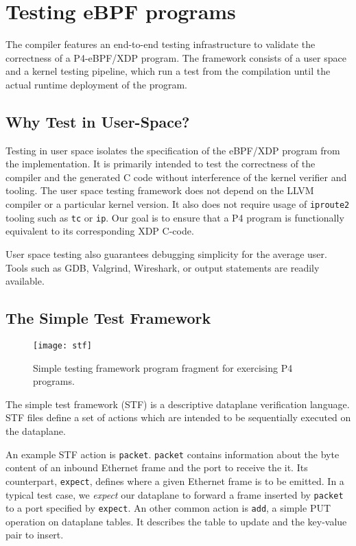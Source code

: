 \section{Testing eBPF programs}\label{sec:testing}
The compiler features an end-to-end testing infrastructure to validate the 
correctness of a P4-eBPF/XDP program. The framework consists of a user space 
and a kernel testing pipeline, which run a test from the compilation 
until the actual runtime deployment of the program.

\subsection{Why Test in User-Space?}
Testing in user space isolates the specification of the eBPF/XDP program from 
the
implementation. It is primarily intended to test the correctness of the
compiler and the generated C code without interference of the kernel verifier
and tooling. The user space testing framework does not depend on the LLVM
compiler or a particular kernel version. It also does not require usage of 
\texttt{iproute2} tooling such as \texttt{tc} or \texttt{ip}. Our goal is to 
ensure that a P4 program is functionally equivalent to its corresponding XDP 
C-code.

User space testing also guarantees debugging simplicity for the average
user. Tools such as GDB, Valgrind, Wireshark, or output statements
are readily available.

\subsection{The Simple Test Framework}
\begin{figure}
	\centering
	\texttt{[image: stf]}
	\caption{Simple testing framework program fragment for exercising P4 programs.}
	\label{fig:stf}
\end{figure}
The simple test framework (STF) is a descriptive dataplane verification 
language. STF files define a set of actions which are intended to be 
sequentially executed on the dataplane.

An example STF action is \texttt{packet}. \texttt{packet} contains information 
about the byte content of an inbound Ethernet frame and the port to receive the 
it. Its counterpart, \texttt{expect}, defines where a given Ethernet frame is 
to be emitted. In a typical test case, we \textit{expect} our dataplane to 
forward a frame inserted by \texttt{packet} to a port specified by 
\texttt{expect}.
An other common action is \texttt{add}, a simple PUT operation 
on dataplane tables. It describes the table to update and the key-value pair 
to insert.


